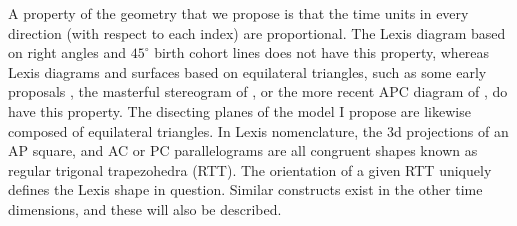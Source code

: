 \documentclass[11pt,oneside,a4paper]{article} %
\begin{document}
A property of the geometry that we propose is that
the time units in every direction (with respect to each index) are proportional. The Lexis
diagram based on right angles and $45^\circ$ birth cohort lines does not have
this property, whereas Lexis diagrams and surfaces based on equilateral
triangles, such as some early proposals \citep[inter
alia, ][]{lexis1875einleitung, lewin1876rapport}, the masterful stereogram of
\citet{perozzo1880della}, or the more recent APC diagram
of \citet{ryder1980cohort}, do have this property. The disecting planes of the
model I propose are likewise composed of equilateral triangles. In Lexis
nomenclature, the 3d projections of an AP square, and AC or PC
parallelograms are all congruent shapes known as regular trigonal trapezohedra
(RTT). The orientation
of a given RTT uniquely defines the Lexis shape in question. Similar constructs
exist in the other time dimensions, and these will also be described. 
\FloatBarrier
\end{document}
